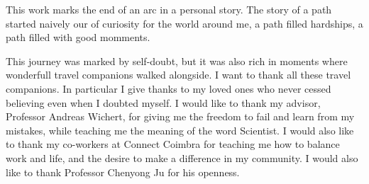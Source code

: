 
\begin{acknowledgments} 

This work marks the end of an arc in a personal story. The story of a path started naively our of curiosity for the world around me, a path filled hardships, a path filled with good momments.

This journey was marked by self-doubt, but it was also rich in moments where wonderfull travel companions walked alongside. I want to thank all these travel companions.
In particular I give thanks to my loved ones who never cessed believing even when I doubted myself.
I would like to thank my advisor, Professor Andreas Wichert, for giving me the freedom to fail and learn from my mistakes, while teaching me the meaning of the word Scientist.
I would also like to thank my co-workers at Connect Coimbra for teaching me how to balance work and life, and the desire to make a difference in my community.
I would also like to thank Professor Chenyong Ju for his openness.
 
\end{acknowledgments}
\clearpage
\thispagestyle{empty}
\cleardoublepage